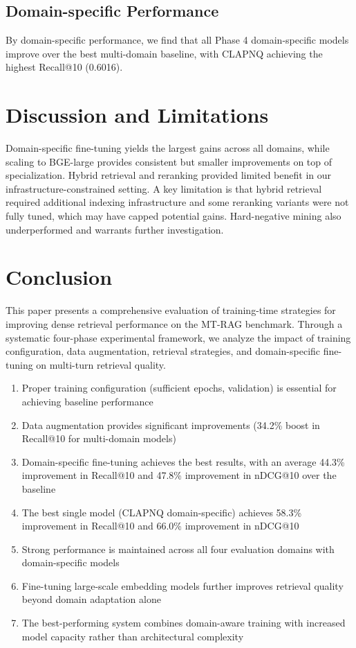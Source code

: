 \documentclass[11pt]{article}
\begin{document}
\subsection{Domain-specific Performance}

By domain-specific performance, we find that all Phase 4 domain-specific models improve over the best multi-domain baseline, with CLAPNQ achieving the highest Recall@10 (0.6016).



\section{Discussion and Limitations}
Domain-specific fine-tuning yields the largest gains across all domains, while scaling to BGE-large provides consistent but smaller improvements on top of specialization. Hybrid retrieval and reranking provided limited benefit in our infrastructure-constrained setting. A key limitation is that hybrid retrieval required additional indexing infrastructure and some reranking variants were not fully tuned, which may have capped potential gains. Hard-negative mining also underperformed and warrants further investigation.

\section{Conclusion}

This paper presents a comprehensive evaluation of training-time strategies for improving dense retrieval performance on the MT-RAG benchmark. Through a systematic four-phase experimental framework, we analyze the impact of training configuration, data augmentation, retrieval strategies, and domain-specific fine-tuning on multi-turn retrieval quality.

\begin{enumerate}
    \item Proper training configuration (sufficient epochs, validation) is essential for achieving baseline performance
    \item Data augmentation provides significant improvements (34.2\% boost in Recall@10 for multi-domain models)
    \item Domain-specific fine-tuning achieves the best results, with an average 44.3\% improvement in Recall@10 and 47.8\% improvement in nDCG@10 over the baseline
    \item The best single model (CLAPNQ domain-specific) achieves 58.3\% improvement in Recall@10 and 66.0\% improvement in nDCG@10
    \item Strong performance is maintained across all four evaluation domains with domain-specific models
    \item Fine-tuning large-scale embedding models further improves retrieval quality beyond domain adaptation alone
    \item The best-performing system combines domain-aware training with increased model capacity rather than architectural complexity

\end{enumerate}
\end{document}
